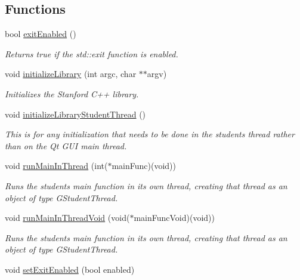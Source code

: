 \subsection*{Functions}
\begin{DoxyCompactItemize}
\item 
bool \mbox{\hyperlink{namespacestanfordcpplib_a5bb1fbda6b82680cc8f04064e55a85c6}{exit\+Enabled}} ()
\begin{DoxyCompactList}\small\item\em Returns true if the std\+::exit function is enabled. \end{DoxyCompactList}\item 
void \mbox{\hyperlink{namespacestanfordcpplib_ab36f2e19ed11765f2b025cc8e4636010}{initialize\+Library}} (int argc, char $\ast$$\ast$argv)
\begin{DoxyCompactList}\small\item\em Initializes the Stanford C++ library. \end{DoxyCompactList}\item 
void \mbox{\hyperlink{namespacestanfordcpplib_a7f8902f8cc454ef116685dbc6008704a}{initialize\+Library\+Student\+Thread}} ()
\begin{DoxyCompactList}\small\item\em This is for any initialization that needs to be done in the student\textquotesingle{}s thread rather than on the Qt G\+UI main thread. \end{DoxyCompactList}\item 
void \mbox{\hyperlink{namespacestanfordcpplib_ab6f7bb8a7230f2d95cf1ff0d6f2fbf0e}{run\+Main\+In\+Thread}} (int($\ast$main\+Func)(void))
\begin{DoxyCompactList}\small\item\em Runs the student\textquotesingle{}s main function in its own thread, creating that thread as an object of type G\+Student\+Thread. \end{DoxyCompactList}\item 
void \mbox{\hyperlink{namespacestanfordcpplib_a647c2bc343e4e0d30483590a58ad3884}{run\+Main\+In\+Thread\+Void}} (void($\ast$main\+Func\+Void)(void))
\begin{DoxyCompactList}\small\item\em Runs the student\textquotesingle{}s main function in its own thread, creating that thread as an object of type G\+Student\+Thread. \end{DoxyCompactList}\item 
void \mbox{\hyperlink{namespacestanfordcpplib_afa57f85846177bb4ed2b4b12fa8a758d}{set\+Exit\+Enabled}} (bool enabled)
$$
\end{DoxyCompactItemize}

